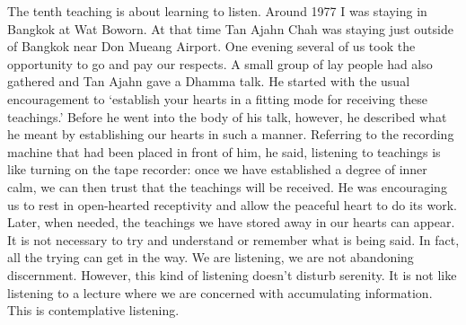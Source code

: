 The tenth teaching is about learning to listen. Around 1977 I was staying in Bangkok at Wat Boworn. At that time Tan Ajahn Chah was staying just outside of Bangkok near Don Mueang Airport. One evening several of us took the opportunity to go and pay our respects. A small group of lay people had also gathered and Tan Ajahn gave a Dhamma talk. He started with the usual encouragement to `establish your hearts in a fitting mode for receiving these teachings.' Before he went into the body of his talk, however, he described what he meant by establishing our hearts in such a manner. Referring to the recording machine that had been placed in front of him, he said, listening to teachings is like turning on the tape recorder: once we have established a degree of inner calm, we can then trust that the teachings will be received. He was encouraging us to rest in open-hearted receptivity and allow the peaceful heart to do its work. Later, when needed, the teachings we have stored away in our hearts can appear. It is not necessary to try and understand or remember what is being said. In fact, all the trying can get in the way. We are listening, we are not abandoning discernment. However, this kind of listening doesn’t disturb serenity. It is not like listening to a lecture where we are concerned with accumulating information. This is contemplative listening.

